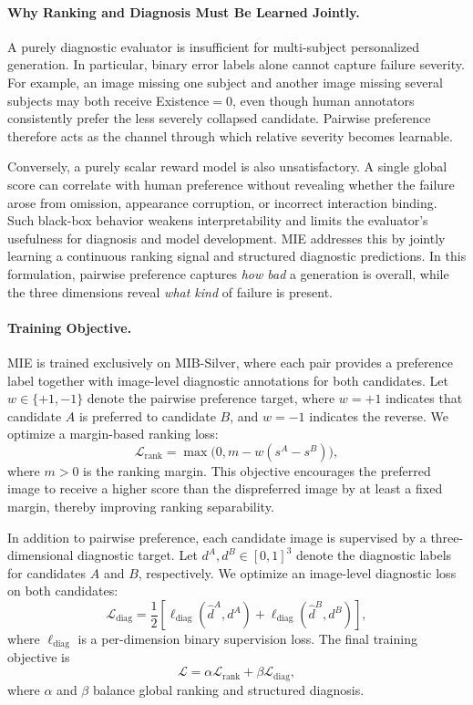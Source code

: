 \documentclass{article}
\begin{document}
\paragraph{Why Ranking and Diagnosis Must Be Learned Jointly.}
A purely diagnostic evaluator is insufficient for multi-subject personalized generation. In particular, binary error labels alone cannot capture failure severity. For example, an image missing one subject and another image missing several subjects may both receive Existence$=0$, even though human annotators consistently prefer the less severely collapsed candidate. Pairwise preference therefore acts as the channel through which relative severity becomes learnable.

Conversely, a purely scalar reward model is also unsatisfactory. A single global score can correlate with human preference without revealing whether the failure arose from omission, appearance corruption, or incorrect interaction binding. Such black-box behavior weakens interpretability and limits the evaluator's usefulness for diagnosis and model development. MIE addresses this by jointly learning a continuous ranking signal and structured diagnostic predictions. In this formulation, pairwise preference captures \emph{how bad} a generation is overall, while the three dimensions reveal \emph{what kind} of failure is present.

\paragraph{Training Objective.}
MIE is trained exclusively on MIB-Silver, where each pair provides a preference label together with image-level diagnostic annotations for both candidates. Let $w \in \{+1,-1\}$ denote the pairwise preference target, where $w=+1$ indicates that candidate $A$ is preferred to candidate $B$, and $w=-1$ indicates the reverse. We optimize a margin-based ranking loss:
\[
\mathcal{L}_{\text{rank}}
=
\max\bigl(0, m - w(s^A - s^B)\bigr),
\]
where $m>0$ is the ranking margin. This objective encourages the preferred image to receive a higher score than the dispreferred image by at least a fixed margin, thereby improving ranking separability.

In addition to pairwise preference, each candidate image is supervised by a three-dimensional diagnostic target. Let $d^A,d^B \in [0,1]^3$ denote the diagnostic labels for candidates $A$ and $B$, respectively. We optimize an image-level diagnostic loss on both candidates:
\[
\mathcal{L}_{\text{diag}}
=
\frac{1}{2}
\left[
\ell_{\text{diag}}(\hat d^A, d^A) + \ell_{\text{diag}}(\hat d^B, d^B)
\right],
\]
where $\ell_{\text{diag}}$ is a per-dimension binary supervision loss. The final training objective is
\[
\mathcal{L}
=
\alpha \mathcal{L}_{\text{rank}} + \beta \mathcal{L}_{\text{diag}},
\]
where $\alpha$ and $\beta$ balance global ranking and structured diagnosis.
\end{document}
